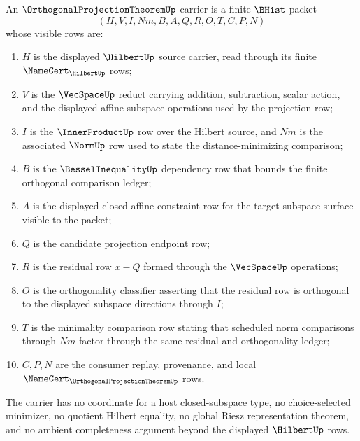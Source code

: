 \begin{definition}\label{def:orthogonal-projection-theorem-carrier}
An $\OrthogonalProjectionTheoremUp$ carrier is a finite $\BHist$ packet
$$
(H,V,I,Nm,B,A,Q,R,O,T,C,P,N)
$$
whose visible rows are:
\begin{enumerate}
\item $H$ is the displayed $\HilbertUp$ source carrier, read through its finite $\NameCert_{\HilbertUp}$ rows;
\item $V$ is the $\VecSpaceUp$ reduct carrying addition, subtraction, scalar action, and the displayed affine subspace operations used by the projection row;
\item $I$ is the $\InnerProductUp$ row over the Hilbert source, and $Nm$ is the associated $\NormUp$ row used to state the distance-minimizing comparison;
\item $B$ is the $\BesselInequalityUp$ dependency row that bounds the finite orthogonal comparison ledger;
\item $A$ is the displayed closed-affine constraint row for the target subspace surface visible to the packet;
\item $Q$ is the candidate projection endpoint row;
\item $R$ is the residual row $x-Q$ formed through the $\VecSpaceUp$ operations;
\item $O$ is the orthogonality classifier asserting that the residual row is orthogonal to the displayed subspace directions through $I$;
\item $T$ is the minimality comparison row stating that scheduled norm comparisons through $Nm$ factor through the same residual and orthogonality ledger;
\item $C,P,N$ are the consumer replay, provenance, and local $\NameCert_{\OrthogonalProjectionTheoremUp}$ rows.
\end{enumerate}
The carrier has no coordinate for a host closed-subspace type, no choice-selected minimizer, no quotient Hilbert equality, no global Riesz representation theorem, and no ambient completeness argument beyond the displayed $\HilbertUp$ rows.
\end{definition}

